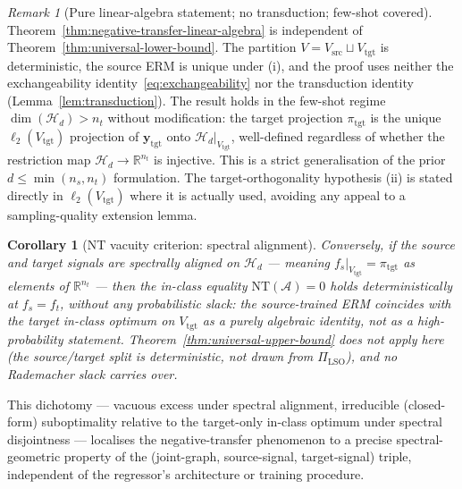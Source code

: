 \documentclass[11pt,a4paper]{article}
\theoremstyle{plain}
\newtheorem{corollary}[theorem]{Corollary}
\theoremstyle{definition}
\theoremstyle{remark}
\newtheorem{remark}[theorem]{Remark}
\newcommand{\by}{\mathbf{y}}
\newcommand{\R}{\mathbb{R}}
\newcommand{\Acal}{\mathcal{A}}
\newcommand{\Hcal}{\mathcal{H}}
\begin{document}
\begin{remark}[Pure linear-algebra statement; no transduction; few-shot covered]
\label{rem:nt-no-exchangeability}
Theorem~\ref{thm:negative-transfer-linear-algebra} is independent
of Theorem~\ref{thm:universal-lower-bound}. The partition
$V = V_{\mathrm{src}} \sqcup V_{\mathrm{tgt}}$ is deterministic,
the source ERM is unique under (i), and the proof uses neither
the exchangeability identity~\eqref{eq:exchangeability} nor the
transduction identity (Lemma~\ref{lem:transduction}). The result
holds in the few-shot regime $\dim(\Hcal_d) > n_t$ without
modification: the target projection $\pi_{\mathrm{tgt}}$ is the
unique $\ell_2(V_{\mathrm{tgt}})$ projection of $\by_{\mathrm{tgt}}$
onto $\Hcal_d|_{V_{\mathrm{tgt}}}$, well-defined regardless of
whether the restriction map $\Hcal_d \to \R^{n_t}$ is injective.
This is a strict generalisation of the prior $d \le \min(n_s,
n_t)$ formulation. The target-orthogonality hypothesis (ii) is
stated directly in $\ell_2(V_{\mathrm{tgt}})$ where it is
actually used, avoiding any appeal to a sampling-quality
extension lemma.
\end{remark}

\begin{corollary}[NT vacuity criterion: spectral alignment]
\label{cor:nt-vacuity}
Conversely, if the source and target signals are \emph{spectrally
aligned} on $\Hcal_d$ --- meaning $f_s|_{V_{\mathrm{tgt}}} =
\pi_{\mathrm{tgt}}$ as elements of $\R^{n_t}$ --- then the
in-class equality $\mathrm{NT}(\Acal) = 0$ holds
\emph{deterministically} at $f_s = f_t$, without any probabilistic
slack: the source-trained ERM coincides with the target in-class
optimum on $V_{\mathrm{tgt}}$ as a purely algebraic identity, not
as a high-probability statement. Theorem~\ref{thm:universal-upper-bound}
does \emph{not} apply here (the source/target split is
deterministic, not drawn from $\Pi_{\mathrm{LSO}}$), and no
Rademacher slack carries over.
\end{corollary}

This dichotomy --- vacuous excess under spectral alignment, irreducible
(closed-form) suboptimality relative to the target-only in-class
optimum under spectral disjointness --- localises the
negative-transfer phenomenon to a precise spectral-geometric property
of the (joint-graph, source-signal, target-signal) triple, independent
of the regressor's architecture or training procedure.
\end{document}
